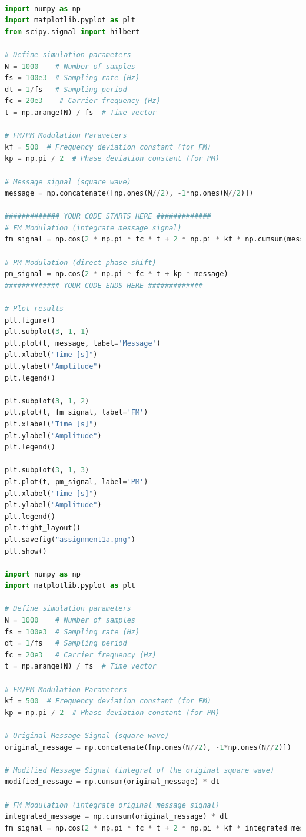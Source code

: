 \documentclass[
	letterpaper, %
	10pt, %
]{CSUniSchoolLabReport}
\begin{document}
\begin{lstlisting}[language=Python]
	
import numpy as np
import matplotlib.pyplot as plt
from scipy.signal import hilbert

# Define simulation parameters
N = 1000    # Number of samples
fs = 100e3  # Sampling rate (Hz)
dt = 1/fs   # Sampling period
fc = 20e3    # Carrier frequency (Hz)
t = np.arange(N) / fs  # Time vector

# FM/PM Modulation Parameters
kf = 500  # Frequency deviation constant (for FM)
kp = np.pi / 2  # Phase deviation constant (for PM)

# Message signal (square wave)
message = np.concatenate([np.ones(N//2), -1*np.ones(N//2)])

############# YOUR CODE STARTS HERE #############
# FM Modulation (integrate message signal)
fm_signal = np.cos(2 * np.pi * fc * t + 2 * np.pi * kf * np.cumsum(message) * dt)

# PM Modulation (direct phase shift)
pm_signal = np.cos(2 * np.pi * fc * t + kp * message)
############# YOUR CODE ENDS HERE #############

# Plot results
plt.figure()
plt.subplot(3, 1, 1)
plt.plot(t, message, label='Message')
plt.xlabel("Time [s]")
plt.ylabel("Amplitude")
plt.legend()

plt.subplot(3, 1, 2)
plt.plot(t, fm_signal, label='FM')
plt.xlabel("Time [s]")
plt.ylabel("Amplitude")
plt.legend()

plt.subplot(3, 1, 3)
plt.plot(t, pm_signal, label='PM')
plt.xlabel("Time [s]")
plt.ylabel("Amplitude")
plt.legend()
plt.tight_layout()
plt.savefig("assignment1a.png")
plt.show()

import numpy as np
import matplotlib.pyplot as plt

# Define simulation parameters
N = 1000    # Number of samples
fs = 100e3  # Sampling rate (Hz)
dt = 1/fs   # Sampling period
fc = 20e3   # Carrier frequency (Hz)
t = np.arange(N) / fs  # Time vector

# FM/PM Modulation Parameters
kf = 500  # Frequency deviation constant (for FM)
kp = np.pi / 2  # Phase deviation constant (for PM)

# Original Message Signal (square wave)
original_message = np.concatenate([np.ones(N//2), -1*np.ones(N//2)])

# Modified Message Signal (integral of the original square wave)
modified_message = np.cumsum(original_message) * dt

# FM Modulation (integrate original message signal)
integrated_message = np.cumsum(original_message) * dt
fm_signal = np.cos(2 * np.pi * fc * t + 2 * np.pi * kf * integrated_message)


\end{lstlisting}
\end{document}
